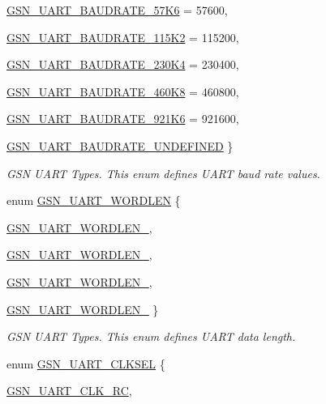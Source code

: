 \begin{DoxyCompactItemize}
\par
\hyperlink{a00656_gga99b0d3d670ac3d61d3a8764fafc3b992abcabb70f14f4d91c07818f934eeb474c}{GSN\_\-UART\_\-BAUDRATE\_\-57K6} =  57600, 
\par
\hyperlink{a00656_gga99b0d3d670ac3d61d3a8764fafc3b992a6ec9479380380d806553c9d1d806aa72}{GSN\_\-UART\_\-BAUDRATE\_\-115K2} =  115200, 
\par
\hyperlink{a00656_gga99b0d3d670ac3d61d3a8764fafc3b992a6ca81661ffd8464d9291b5f77e4c9321}{GSN\_\-UART\_\-BAUDRATE\_\-230K4} =  230400, 
\par
\hyperlink{a00656_gga99b0d3d670ac3d61d3a8764fafc3b992a6b3663c967032ba0b467a1433e940bee}{GSN\_\-UART\_\-BAUDRATE\_\-460K8} =  460800, 
\par
\hyperlink{a00656_gga99b0d3d670ac3d61d3a8764fafc3b992a24763d1145ed75345cd3a62f8d1b453f}{GSN\_\-UART\_\-BAUDRATE\_\-921K6} =  921600, 
\par
\hyperlink{a00656_gga99b0d3d670ac3d61d3a8764fafc3b992a3848e75f1204235b9c747ab67438bd13}{GSN\_\-UART\_\-BAUDRATE\_\-UNDEFINED}
 \}
\begin{DoxyCompactList}\small\item\em GSN UART Types. This enum defines UART baud rate values. \end{DoxyCompactList}\item 
enum \hyperlink{a00656_ga9082153fb94765f4ce91b584f1d8a0a3}{GSN\_\-UART\_\-WORDLEN} \{ \par
\hyperlink{a00656_gga9082153fb94765f4ce91b584f1d8a0a3a522feaf3af3136ecae56f34efc1f3c98}{GSN\_\-UART\_\-WORDLEN\_}, 
\par
\hyperlink{a00656_gga9082153fb94765f4ce91b584f1d8a0a3a7c7427fcbff646d1e4b19e5b33e49cf6}{GSN\_\-UART\_\-WORDLEN\_}, 
\par
\hyperlink{a00656_gga9082153fb94765f4ce91b584f1d8a0a3a0589fde9876f57d818bdc126836237ba}{GSN\_\-UART\_\-WORDLEN\_}, 
\par
\hyperlink{a00656_gga9082153fb94765f4ce91b584f1d8a0a3a5a4566a59533384391a29c0024001695}{GSN\_\-UART\_\-WORDLEN\_}
 \}
\begin{DoxyCompactList}\small\item\em GSN UART Types. This enum defines UART data length. \end{DoxyCompactList}\item 
enum \hyperlink{a00656_gad03ef3aa80077ad749fb3afd6e9a23af}{GSN\_\-UART\_\-CLKSEL} \{ \par
\hyperlink{a00656_ggad03ef3aa80077ad749fb3afd6e9a23afa65224eb1061d57170c9027f40a5e9282}{GSN\_\-UART\_\-CLK\_\-RC}, 

\end{DoxyCompactItemize}
